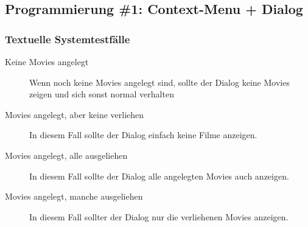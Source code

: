 \documentclass[ngerman]{scrartcl}
\title{\mytitle}
\author{\myauthor}
\newcommand{\blattnummer}{9}												%
\newcommand{\aufgabe}{2}
\begin{document}
	\setcounter{section}{\blattnummer}
	\setcounter{subsection}{\aufgabe-1}
	\subsection{Programmierung \#1: Context-Menu + Dialog}
	\setcounter{subsubsection}{4}
	\subsubsection{Textuelle Systemtestfälle}

	\begin{description}
	\item [Keine Movies angelegt] Wenn noch keine Movies angelegt sind, sollte der Dialog keine Movies zeigen und sich sonst normal verhalten
	\item [Movies angelegt, aber keine verliehen] In diesem Fall sollte der Dialog einfach keine Filme anzeigen.
	\item [Movies angelegt, alle ausgeliehen] In diesem Fall sollte der Dialog alle angelegten Movies auch anzeigen.
	\item [Movies angelegt, manche ausgeliehen] In diesem Fall sollter der Dialog nur die verliehenen Movies anzeigen.
	\end{description}
\end{document}
